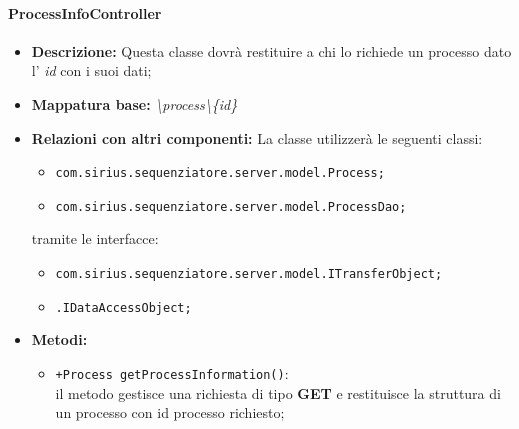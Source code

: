 \paragraph{ProcessInfoController}%
\begin{itemize}
	\item \textbf{Descrizione: } Questa classe dovrà restituire a chi lo richiede un processo dato l' \textit{id} con i suoi dati;
	\item \textbf{Mappatura base: }\textit{\textbackslash process\textbackslash \{id\}}
	\item \textbf{Relazioni con altri componenti: }
	La classe utilizzerà le seguenti classi:
	\begin{itemize}
		\item \texttt{com.sirius.sequenziatore.server.model.Process;}
		\item \texttt{com.sirius.sequenziatore.server.model.ProcessDao;}
	\end{itemize}
	tramite le interfacce:
	\begin{itemize}
		\item \texttt{com.sirius.sequenziatore.server.model.ITransferObject;}
		\item \texttt{\sModel .IDataAccessObject;}
	\end{itemize}
	\item \textbf{Metodi: }\begin{itemize}
					\item \texttt{+Process getProcessInformation()}:\\
					il metodo gestisce una richiesta di tipo \textbf{GET} e restituisce la struttura di un processo con id processo richiesto;
				\end{itemize}
\end{itemize}